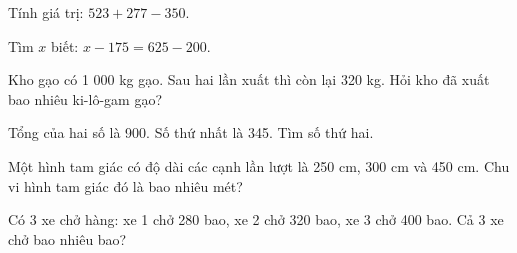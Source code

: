 \begin{ex} %
Tính giá trị: $523 + 277 - 350$.
\end{ex}

\begin{ex} %
Tìm $x$ biết: $x - 175 = 625 - 200$.
\end{ex}

\begin{ex} %
Kho gạo có 1 000 kg gạo. Sau hai lần xuất thì còn lại 320 kg. Hỏi kho đã xuất bao nhiêu ki-lô-gam gạo?
\end{ex}

\begin{ex} %
Tổng của hai số là 900. Số thứ nhất là 345. Tìm số thứ hai.
\end{ex}

\begin{ex} %
Một hình tam giác có độ dài các cạnh lần lượt là 250 cm, 300 cm và 450 cm. Chu vi hình tam giác đó là bao nhiêu mét?
\end{ex}

\begin{ex} %
Có 3 xe chở hàng: xe 1 chở 280 bao, xe 2 chở 320 bao, xe 3 chở 400 bao. Cả 3 xe chở bao nhiêu bao?
\end{ex}
